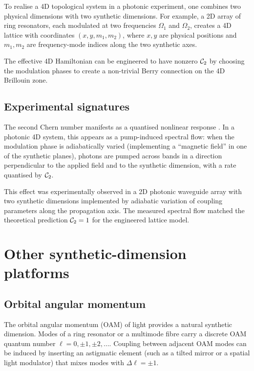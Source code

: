 To realise a 4D topological system in a photonic experiment, one
combines two physical dimensions with two synthetic dimensions.  For
example, a 2D array of ring resonators, each modulated at two
frequencies $\Omega_1$ and $\Omega_2$, creates a 4D lattice with
coordinates $(x,y,m_1,m_2)$, where $x,y$ are physical positions and
$m_1,m_2$ are frequency-mode indices along the two synthetic axes.

The effective 4D Hamiltonian can be engineered to have nonzero $\mathcal{C}_2$
by choosing the modulation phases to create a non-trivial Berry
connection on the 4D Brillouin zone.

\subsection{Experimental signatures}
\label{sec:ch16-4d-signatures}

The second Chern number manifests as a quantised nonlinear response
\cite{ozawa2018topological,price2022roadmap}.
In a photonic 4D system, this appears as a pump-induced spectral flow:
when the modulation phase is adiabatically varied (implementing a
``magnetic field'' in one of the synthetic planes), photons are pumped
across bands in a direction perpendicular to the applied field and to
the synthetic dimension, with a rate quantised by $\mathcal{C}_2$.

This effect was experimentally observed in a 2D photonic waveguide
array with two synthetic dimensions implemented by adiabatic variation
of coupling parameters along the propagation axis.  The measured
spectral flow matched the theoretical prediction $\mathcal{C}_2=1$ for the
engineered lattice model.

\section{Other synthetic-dimension platforms}
\label{sec:ch16-platforms}

\subsection{Orbital angular momentum}
\label{sec:ch16-oam}

The orbital angular momentum (OAM) of light provides a natural
synthetic dimension.  Modes of a ring resonator or a multimode fibre
carry a discrete OAM quantum number $\ell=0,\pm 1,\pm 2,\ldots$.
Coupling between adjacent OAM modes can be induced by inserting an
astigmatic element (such as a tilted mirror or a spatial light
modulator) that mixes modes with $\Delta\ell=\pm 1$.

